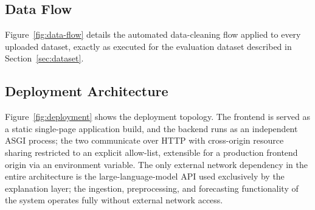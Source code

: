 

\subsection{Data Flow}
Figure~\ref{fig:data-flow} details the automated data-cleaning flow applied to every uploaded dataset, exactly as executed for the evaluation dataset described in Section~\ref{sec:dataset}.



\subsection{Deployment Architecture}
Figure~\ref{fig:deployment} shows the deployment topology. The frontend is served as a static single-page application build, and the backend runs as an independent ASGI process; the two communicate over HTTP with cross-origin resource sharing restricted to an explicit allow-list, extensible for a production frontend origin via an environment variable. The only external network dependency in the entire architecture is the large-language-model API used exclusively by the explanation layer; the ingestion, preprocessing, and forecasting functionality of the system operates fully without external network access.


